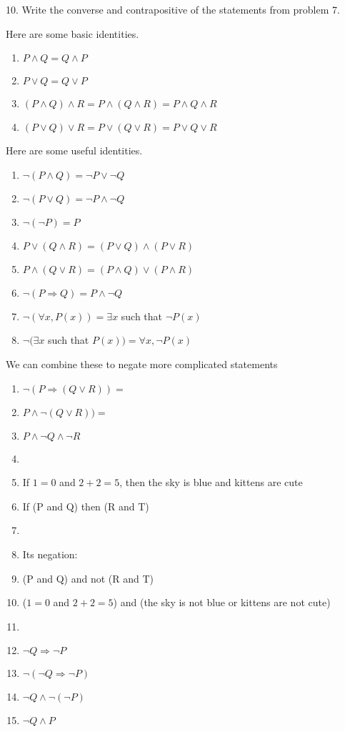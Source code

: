 \documentclass[12pt, reqno]{amsart}
\begin{document}
10. Write the converse and contrapositive of the statements from problem 7.


\newpage


Here are some basic identities.
\begin{enumerate}
\item $P \wedge Q = Q \wedge P$
\item $P \vee Q = Q \vee P$
\item $(P \wedge Q) \wedge R = P \wedge (Q \wedge R) = P \wedge Q \wedge R$
\item $(P \vee Q) \vee R = P \vee (Q \vee R) = P \vee Q \vee R$  
\end{enumerate}
\smallskip

Here are some useful identities.

\begin{enumerate}
\item $\neg(P \wedge Q) = \neg P \vee \neg Q$
\item $\neg(P \vee Q) = \neg P \wedge \neg Q$
\item $\neg(\neg P) = P$
\item $P \vee (Q \wedge R) = (P \vee Q) \wedge (P \vee R)$
\item $P \wedge (Q \vee R) = (P \wedge Q) \vee (P \wedge R)$
\item $\neg (P \Rightarrow Q) = P \wedge \neg Q$
\item $\neg (\forall x, P(x)) = \exists x$  such that $\neg P(x)$
\item $\neg (\exists x$ such that $P(x)) = \forall x, \neg P(x)$

\end{enumerate}
\vspace{10pt}

We can combine these to negate more complicated statements

\begin{enumerate}
\item $\neg(P \Rightarrow (Q \vee R)) = $ 
\item [] $P \wedge \neg (Q \vee R)) = $ 
\item [] $P \wedge \neg Q \wedge \neg R$ 
\item []
\item If $1 = 0$ and $2 + 2 = 5$, then the sky is blue and kittens are cute
\item [] If (P and Q) then (R and T)
\item [] 
\item [] Its negation:
\item [] (P and Q) and not (R and T)
\item [] ($1 = 0$ and $2 + 2  = 5$) and (the sky is not blue or kittens are not cute)
\item []
\item $\neg Q \Rightarrow \neg P$
\item [] $\neg (\neg Q \Rightarrow \neg P)$
\item [] $\neg Q \wedge \neg(\neg P)$
\item [] $\neg Q \wedge P$
\end{enumerate}
\end{document}
